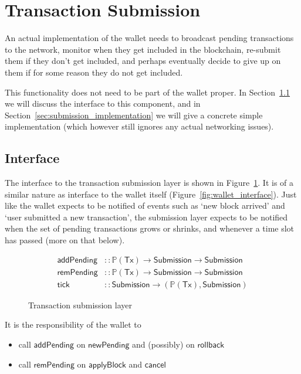 \documentclass{article}
\numberwithin{equation}{lemma}
\begin{document}
\section{Transaction Submission}
\label{sec:transaction_submission}

An actual implementation of the wallet needs to broadcast pending transactions
to the network, monitor when they get included in the blockchain, re-submit them
if they don't get included, and perhaps eventually decide to give up on them if
for some reason they do not get included.

This functionality does not need to be part of the wallet proper. In
Section~\ref{sec:submission_interface} we will discuss the interface to this
component, and in Section~\ref{sec:submission_implementation} we will give a
concrete simple implementation (which however still ignores any actual
networking issues).

\subsection{Interface}
\label{sec:submission_interface}

The interface to the transaction submission layer is shown in
Figure~\ref{fig:transaction_submission_layer}. It is of a similar nature as
interface to the wallet itself (Figure~\ref{fig:wallet_interface}). Just like
the wallet expects to be notified of events such as `new block arrived' and
`user submitted a new transaction', the submission layer expects to be notified
when the set of pending transactions grows or shrinks, and whenever a time slot
has passed (more on that below).

\begin{figure}
\begin{align*}
\mathsf{addPending} & :: \mathbb{P}(\mathsf{Tx}) \rightarrow \mathsf{Submission} \rightarrow \mathsf{Submission} \\
\mathsf{remPending} & :: \mathbb{P}(\mathsf{Tx}) \rightarrow \mathsf{Submission} \rightarrow \mathsf{Submission} \\
\mathsf{tick}       & :: \mathsf{Submission} \rightarrow (\mathbb{P}(\mathsf{Tx}), \mathsf{Submission})
\end{align*}
\caption{\label{fig:transaction_submission_layer}Transaction submission layer}
\end{figure}

It is the responsibility of the wallet to
%
\begin{itemize}
\item call $\mathsf{addPending}$ on $\mathsf{newPending}$ and (possibly) on $\mathsf{rollback}$
\item call $\mathsf{remPending}$ on $\mathsf{applyBlock}$ and $\mathsf{cancel}$
\end{itemize}
\end{document}
